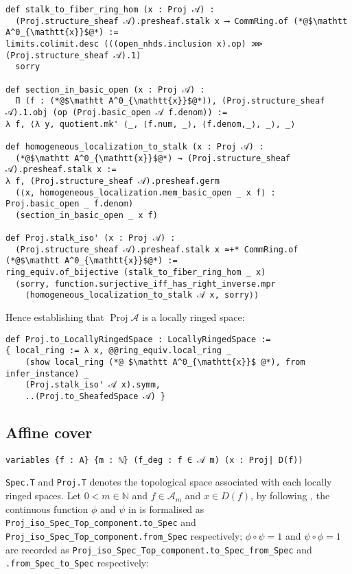 \documentclass[a4paper,UKenglish,cleveref, autoref, thm-restate]{lipics-v2021}
\begin{document}
\begin{lstlisting}
def stalk_to_fiber_ring_hom (x : Proj 𝒜) :
  (Proj.structure_sheaf 𝒜).presheaf.stalk x ⟶ CommRing.of (*@$\mathtt A^0_{\mathtt{x}}$@*) :=
limits.colimit.desc (((open_nhds.inclusion x).op) ⋙ (Proj.structure_sheaf 𝒜).1) 
  sorry

def section_in_basic_open (x : Proj 𝒜) :
  Π (f : (*@$\mathtt A^0_{\mathtt{x}}$@*)), (Proj.structure_sheaf 𝒜).1.obj (op (Proj.basic_open 𝒜 f.denom)) :=
λ f, ⟨λ y, quotient.mk' ⟨_, ⟨f.num, _⟩, ⟨f.denom,_⟩, _⟩, _⟩

def homogeneous_localization_to_stalk (x : Proj 𝒜) :
  (*@$\mathtt A^0_{\mathtt{x}}$@*) → (Proj.structure_sheaf 𝒜).presheaf.stalk x :=
λ f, (Proj.structure_sheaf 𝒜).presheaf.germ
  (⟨x, homogeneous_localization.mem_basic_open _ x f⟩ : Proj.basic_open _ f.denom)
  (section_in_basic_open _ x f)

def Proj.stalk_iso' (x : Proj 𝒜) :
  (Proj.structure_sheaf 𝒜).presheaf.stalk x ≃+* CommRing.of (*@$\mathtt A^0_{\mathtt{x}}$@*) :=
ring_equiv.of_bijective (stalk_to_fiber_ring_hom _ x)
  ⟨sorry, function.surjective_iff_has_right_inverse.mpr 
    ⟨homogeneous_localization_to_stalk 𝒜 x, sorry⟩⟩
\end{lstlisting}
Hence establishing that $\operatorname{Proj}\mathcal{A}$ is a locally ringed space:
\begin{lstlisting}
def Proj.to_LocallyRingedSpace : LocallyRingedSpace :=
{ local_ring := λ x, @@ring_equiv.local_ring _
    (show local_ring (*@ $\mathtt A^0_{\mathtt{x}}$ @*), from infer_instance) _
    (Proj.stalk_iso' 𝒜 x).symm,
    ..(Proj.to_SheafedSpace 𝒜) }
\end{lstlisting}

\subsection{Affine cover}
\begin{lstlisting}
variables {f : A} {m : ℕ} (f_deg : f ∈ 𝒜 m) (x : Proj| D(f))
\end{lstlisting}
\lstinline{Spec.T} and \lstinline{Proj.T} denotes the topological space associated with each locally ringed spaces. Let $0 < m \in \mathbb N$ and $f\in\mathcal A_m$ and $x \in D(f)$, by following , the continuous function $\phi$ and $\psi$ in  is formalised as \lstinline{Proj_iso_Spec_Top_component.to_Spec} and \lstinline{Proj_iso_Spec_Top_component.from_Spec} respectively; $\phi\circ\psi = 1$ and $\psi\circ\phi = 1$ are recorded as \lstinline{Proj_iso_Spec_Top_component.to_Spec_from_Spec} and \lstinline{.from_Spec_to_Spec} respectively:
\end{document}
